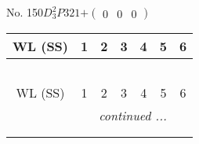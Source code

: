 \documentclass[fleqn,9pt,landscape]{jsarticle}
\begin{document}
\newpage
No. 150\quad$D_{3}^{2}$\quad$P321$\quad[ trigonal ]\quad$+\begin{pmatrix} 0 & 0 & 0 \end{pmatrix}$
\begin{center}
\renewcommand{\arraystretch}{1.2}
\begin{longtable}{ccccccc}
 \hline \hline
WL (SS) & 1 & 2 & 3 & 4 & 5 & 6 \\ \hline \endfirsthead

\multicolumn{6}{l}{\tablename\ \thetable{}} \\
 \hline \hline
WL (SS) & 1 & 2 & 3 & 4 & 5 & 6 \\ \hline \endhead

 \hline \hline
\multicolumn{6}{r}{\footnotesize\it continued ...} \\ \endfoot

 \hline \hline
\multicolumn{6}{r}{} \\ \endlastfoot


\end{longtable}
\end{center}
\end{document}
